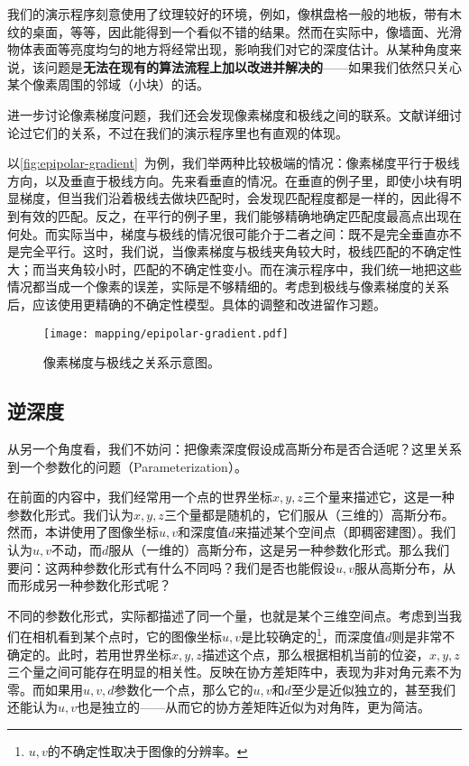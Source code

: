 我们的演示程序刻意使用了纹理较好的环境，例如，像棋盘格一般的地板，带有木纹的桌面，等等，因此能得到一个看似不错的结果。然而在实际中，像墙面、光滑物体表面等亮度均匀的地方将经常出现，影响我们对它的深度估计。从某种角度来说，该问题是\textbf{无法在现有的算法流程上加以改进并解决的}——如果我们依然只关心某个像素周围的邻域（小块）的话。

进一步讨论像素梯度问题，我们还会发现像素梯度和极线之间的联系。文献\cite{Engel2013}详细讨论过它们的关系，不过在我们的演示程序里也有直观的体现。

以\autoref{fig:epipolar-gradient}~为例，我们举两种比较极端的情况：像素梯度平行于极线方向，以及垂直于极线方向。先来看垂直的情况。在垂直的例子里，即使小块有明显梯度，但当我们沿着极线去做块匹配时，会发现匹配程度都是一样的，因此得不到有效的匹配。反之，在平行的例子里，我们能够精确地确定匹配度最高点出现在何处。而实际当中，梯度与极线的情况很可能介于二者之间：既不是完全垂直亦不是完全平行。这时，我们说，当像素梯度与极线夹角较大时，极线匹配的不确定性大；而当夹角较小时，匹配的不确定性变小。而在演示程序中，我们统一地把这些情况都当成一个像素的误差，实际是不够精细的。考虑到极线与像素梯度的关系后，应该使用更精确的不确定性模型。具体的调整和改进留作习题。

\begin{figure}[!htp]
	\centering
	\texttt{[image: mapping/epipolar-gradient.pdf]}
	\caption{像素梯度与极线之关系示意图。}
	\label{fig:epipolar-gradient}
\end{figure}

\subsection{逆深度}
从另一个角度看，我们不妨问：把像素深度假设成高斯分布是否合适呢？这里关系到一个参数化的问题（Parameterization）。

\clearpage
在前面的内容中，我们经常用一个点的世界坐标$x,y,z$三个量来描述它，这是一种参数化形式。我们认为$x,y,z$三个量都是随机的，它们服从（三维的）高斯分布。然而，本讲使用了图像坐标$u,v$和深度值$d$来描述某个空间点（即稠密建图）。我们认为$u,v$不动，而$d$服从（一维的）高斯分布，这是另一种参数化形式。那么我们要问：这两种参数化形式有什么不同吗？我们是否也能假设$u,v$服从高斯分布，从而形成另一种参数化形式呢？

不同的参数化形式，实际都描述了同一个量，也就是某个三维空间点。考虑到当我们在相机看到某个点时，它的图像坐标$u,v$是比较确定的\footnote{$u,v$的不确定性取决于图像的分辨率。}，而深度值$d$则是非常不确定的。此时，若用世界坐标$x,y,z$描述这个点，那么根据相机当前的位姿，$x,y,z$三个量之间可能存在明显的相关性。反映在协方差矩阵中，表现为非对角元素不为零。而如果用$u,v,d$参数化一个点，那么它的$u,v$和$d$至少是近似独立的，甚至我们还能认为$u,v$也是独立的——从而它的协方差矩阵近似为对角阵，更为简洁。

